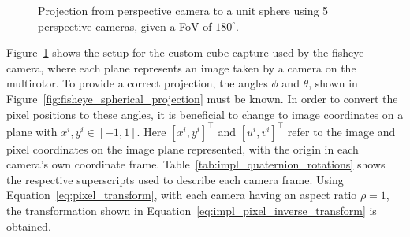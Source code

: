 \begin{figure}[!htb]
    
    \caption{Projection from perspective camera to a unit sphere using 5 perspective cameras, given a FoV of $180^\circ$.}
    \label{fig:impl_Sphere_projection}
\end{figure}

Figure~\ref{fig:impl_Sphere_projection} shows the setup for the custom cube capture used by the fisheye camera, where each plane represents an image taken by a camera on the multirotor. To provide a correct projection, the angles $\phi$ and $\theta$, shown in Figure~\ref{fig:fisheye_spherical_projection} must be known. In order to convert the pixel positions to these angles, it is beneficial to change to image coordinates on a plane with $x^i,y^i \in [-1,1]$. Here $[x^i, y^i]^\top$ and $[u^i,v^i]^\top$ refer to the image and pixel coordinates on the image plane represented, with the origin in each camera's own coordinate frame. Table~\ref{tab:impl_quaternion_rotations} shows the respective superscripts used to describe each camera frame. Using Equation~\eqref{eq:pixel_transform}, with each camera having an aspect ratio $\rho = 1$, the transformation shown in Equation~\eqref{eq:impl_pixel_inverse_transform} is obtained.

